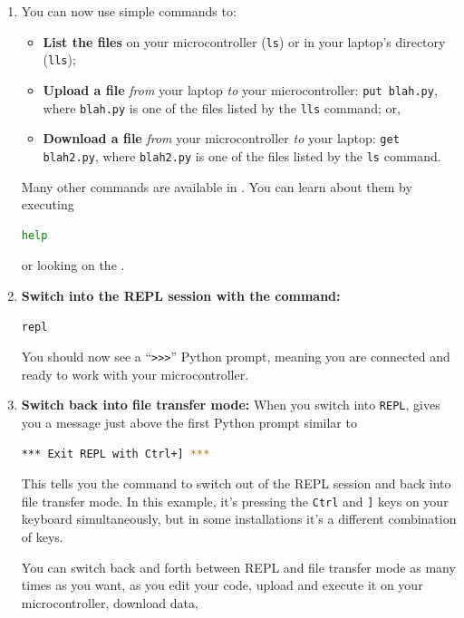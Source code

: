 \begin{enumerate}
\item You can now use simple commands to: \begin{itemize}
	\item \textbf{List the files} on your microcontroller (\texttt{ls}) or in your laptop's directory (\texttt{lls}); 
	\item \textbf{Upload a file} \textit{from} your laptop \textit{to} your microcontroller: \texttt{put blah.py}, where \texttt{blah.py} is one of the files listed by the \texttt{lls} command; or,
	\item \textbf{Download a file} \textit{from} your microcontroller \textit{to} your laptop: \texttt{get blah2.py}, where \texttt{blah2.py} is one of the files listed by the \texttt{ls} command.
\end{itemize} 
Many other commands are available in \mpfshell.
You can learn about them by executing
\begin{lstlisting}[language=bash]
help
\end{lstlisting}
 or looking on the .
\item \textbf{Switch into the REPL session with the command:}
\begin{lstlisting}[language=bash]
repl
\end{lstlisting}
You should now see a ``\verb|>>>|'' Python prompt, meaning you are connected and ready to work with your microcontroller.

\item \textbf{Switch back into file transfer mode:}
When you switch into \texttt{REPL}, \mpfshell gives you a message just above the first Python prompt similar to
\begin{lstlisting}[language=bash]
*** Exit REPL with Ctrl+] ***
\end{lstlisting}
This tells you the command to switch out of the REPL session and back into file transfer mode. In this example, it's pressing the \verb|Ctrl| and \verb|]| keys on your keyboard simultaneously, but in some installations it's a different combination of keys.

\smallskip 
You can switch back and forth between REPL and file transfer mode as many times as you want, as you edit your code, upload and execute it on your microcontroller, download data, \etc

\end{enumerate}
	  
